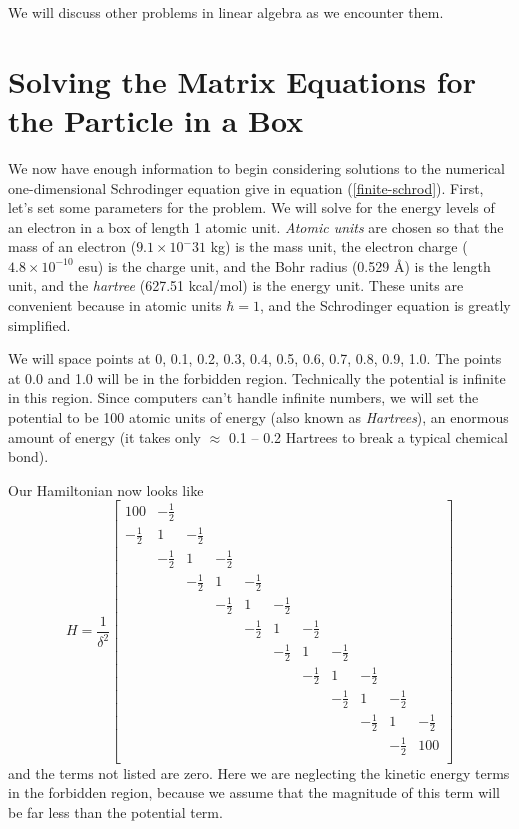 We will discuss other problems in linear algebra as we encounter them.

\section{Solving the Matrix Equations for the Particle in a Box}
We now have enough information to begin considering solutions to the
numerical one-dimensional Schrodinger equation give in equation
(\ref{finite-schrod}). First, let's set some parameters for the
problem. We will solve for the energy levels of an electron in a box
of length 1 atomic unit. \emph{Atomic units} are chosen so that the
mass of an electron ($9.1\times10^-31$ kg) is the mass unit, the
electron charge ($4.8\times10^{-10}$ esu) is the charge unit, and the
Bohr radius (0.529 \AA) is the length unit, and the \emph{hartree}
(627.51 kcal/mol) is the energy unit. These units are convenient
because in atomic units $\hbar=1$, and the Schrodinger equation is
greatly simplified.

We will space points at {0, 0.1, 0.2, 0.3, 0.4, 0.5, 0.6, 0.7, 0.8,
0.9, 1.0}. The points at 0.0 and 1.0 will be in the forbidden
region. Technically the potential is infinite in this region. Since
computers can't handle infinite numbers, we will set the potential to
be 100 atomic units of energy (also known as \emph{Hartrees}), an
enormous amount of energy (it takes only $\approx$ 0.1 -- 0.2 Hartrees
to break a typical chemical bond).

Our Hamiltonian now looks like
\begin{equation}
H = \frac{1}{\delta^2}\left[
\begin{array}{ccccccccccc}
100&-\frac{1}{2}&&&&&&&&&\\
-\frac{1}{2}&1&-\frac{1}{2}&&&&&&&&\\
&-\frac{1}{2}&1&-\frac{1}{2}&&&&&&&\\
&&-\frac{1}{2}&1&-\frac{1}{2}&&&&&&\\
&&&-\frac{1}{2}&1&-\frac{1}{2}&&&&&\\
&&&&-\frac{1}{2}&1&-\frac{1}{2}&&&&\\
&&&&&-\frac{1}{2}&1&-\frac{1}{2}&&&\\
&&&&&&-\frac{1}{2}&1&-\frac{1}{2}&&\\
&&&&&&&-\frac{1}{2}&1&-\frac{1}{2}&\\
&&&&&&&&-\frac{1}{2}&1&-\frac{1}{2}\\
&&&&&&&&&-\frac{1}{2}&100\\
\end{array}
\right]
\label{conf-el-ham}
\end{equation}
and the terms not listed are zero.
Here we are neglecting the kinetic energy terms in the forbidden
region, because we assume that the magnitude of this term will be far
less than the potential term.

